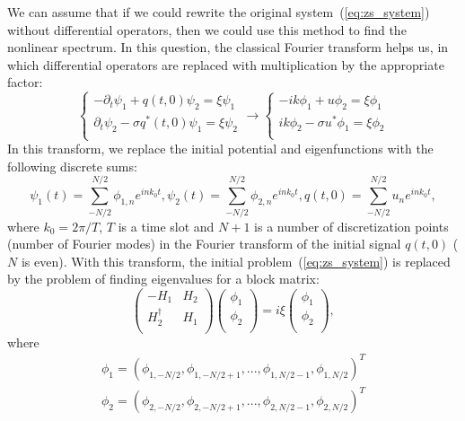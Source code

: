 We can assume that if we could rewrite the original system~(\ref{eq:zs_system}) without differential operators, then we could use this method to find the nonlinear spectrum. In this question, the classical Fourier transform helps us, in which differential operators are replaced with multiplication by the appropriate factor:
\begin{equation}
\left\{
\begin{aligned}
	- \partial_{t} \psi_1 + q(t,0) \psi_2 = \xi \psi_1 \\
	\partial_{t} \psi_2 - \sigma q^{*}(t,0) \psi_1 = \xi \psi_2 \\
\end{aligned}
\right.
\to
\left\{
\begin{aligned}
	- i k \phi_1 + u \phi_2 = \xi \phi_1 \\
	i k \phi_2 - \sigma u^{*} \phi_1 = \xi \phi_2 \\
\end{aligned}
\right.
\end{equation}
In this transform, we replace the initial potential and eigenfunctions with the following discrete sums:
\begin{equation}
	\psi_1(t) = \sum_{-N/2}^{N/2} \phi_{1,n} e^{in k_0 t},
	\psi_2(t) = \sum_{-N/2}^{N/2} \phi_{2,n} e^{in k_0 t},
	q(t,0) = \sum_{-N/2}^{N/2} u_n e^{in k_0 t},
\end{equation}
where $ k_0 = 2\pi/T $, $T$ is a time slot and $N+1$ is a number of discretization points (number of Fourier modes)
in the Fourier transform of the initial signal $ q(t,0) $ ($N$ is even).
With this transform, the initial problem~(\ref{eq:zs_system})
is replaced by the problem of finding eigenvalues for a block matrix:
\begin{equation}
    \begin{pmatrix}
    	-H_1 & H_2 \\
    	H_2^{\dagger} & H_1 \\
    \end{pmatrix}
    \begin{pmatrix}
    	\phi_1 \\
    	\phi_2  \\
    \end{pmatrix}
    = i \xi
    \begin{pmatrix}
    	\phi_1 \\
    	\phi_2  \\
    \end{pmatrix} {,}
\end{equation}
where
\begin{eqnarray}
    \phi_1 = (\phi_{1,-N/2}, \phi_{1,-N/2+1}, ..., \phi_{1,N/2-1}, \phi_{1,N/2})^{T} \nonumber \\
    \phi_2 = (\phi_{2,-N/2}, \phi_{2,-N/2+1}, ..., \phi_{2,N/2-1}, \phi_{2,N/2})^{T}
\end{eqnarray}
